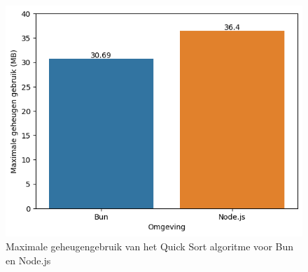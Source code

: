 \begin{figure}[H]
  \centering
  \includegraphics{graphics/RAMScript.png}
  \caption{\label{fig:RAMscript}Maximale geheugengebruik van het Quick Sort algoritme voor Bun en Node.js}
\end{figure}

